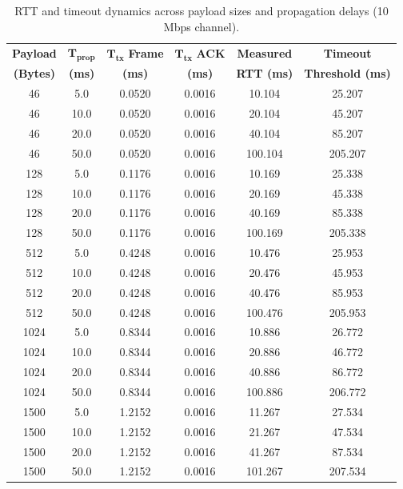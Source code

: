 \documentclass[11pt,a4paper]{article}
\begin{document}
\begin{table}[H]
    \centering
    \footnotesize
    \renewcommand{\arraystretch}{0.92}
    \setlength{\tabcolsep}{8pt}
    \begin{tabular}{cccccc}
        \toprule
        \textbf{Payload} & \(\boldsymbol{T_{\text{prop}}}\) & \(\boldsymbol{T_{\text{tx}}}\) \textbf{Frame} & \(\boldsymbol{T_{\text{tx}}}\) \textbf{ACK} & \textbf{Measured} & \textbf{Timeout} \\
        \textbf{(Bytes)} & \textbf{(ms)} & \textbf{(ms)} & \textbf{(ms)} & \textbf{RTT (ms)} & \textbf{Threshold (ms)} \\
        \midrule
        46   & 5.0  & 0.0520 & 0.0016 & 10.104 & 25.207 \\
        46   & 10.0 & 0.0520 & 0.0016 & 20.104 & 45.207 \\
        46   & 20.0 & 0.0520 & 0.0016 & 40.104 & 85.207 \\
        46   & 50.0 & 0.0520 & 0.0016 & 100.104 & 205.207 \\
        \midrule
        128  & 5.0  & 0.1176 & 0.0016 & 10.169 & 25.338 \\
        128  & 10.0 & 0.1176 & 0.0016 & 20.169 & 45.338 \\
        128  & 20.0 & 0.1176 & 0.0016 & 40.169 & 85.338 \\
        128  & 50.0 & 0.1176 & 0.0016 & 100.169 & 205.338 \\
        \midrule
        512  & 5.0  & 0.4248 & 0.0016 & 10.476 & 25.953 \\
        512  & 10.0 & 0.4248 & 0.0016 & 20.476 & 45.953 \\
        512  & 20.0 & 0.4248 & 0.0016 & 40.476 & 85.953 \\
        512  & 50.0 & 0.4248 & 0.0016 & 100.476 & 205.953 \\
        \midrule
        1024 & 5.0  & 0.8344 & 0.0016 & 10.886 & 26.772 \\
        1024 & 10.0 & 0.8344 & 0.0016 & 20.886 & 46.772 \\
        1024 & 20.0 & 0.8344 & 0.0016 & 40.886 & 86.772 \\
        1024 & 50.0 & 0.8344 & 0.0016 & 100.886 & 206.772 \\
        \midrule
        1500 & 5.0  & 1.2152 & 0.0016 & 11.267 & 27.534 \\
        1500 & 10.0 & 1.2152 & 0.0016 & 21.267 & 47.534 \\
        1500 & 20.0 & 1.2152 & 0.0016 & 41.267 & 87.534 \\
        1500 & 50.0 & 1.2152 & 0.0016 & 101.267 & 207.534 \\
        \bottomrule
    \end{tabular}
    \caption{RTT and timeout dynamics across payload sizes and propagation delays (10 Mbps channel).}
    \label{tab:test1_rtt}
\end{table}
\end{document}
